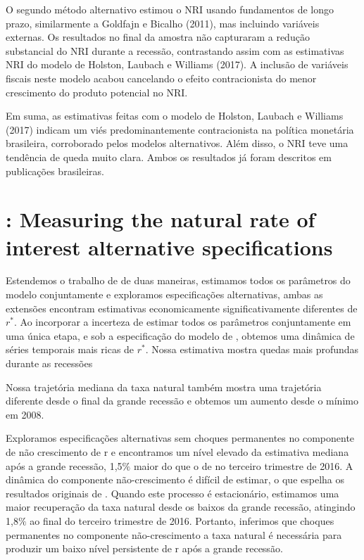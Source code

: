 \documentclass[11pt,oneside,a4paper]{article}
\begin{document}
O segundo método alternativo estimou o NRI usando fundamentos de longo prazo, similarmente a Goldfajn e Bicalho (2011), mas incluindo variáveis externas. Os resultados no final da amostra não capturaram a redução substancial do NRI durante a recessão, contrastando assim com as estimativas NRI do modelo de Holston, Laubach e Williams (2017). A inclusão de variáveis fiscais neste modelo acabou cancelando o efeito contracionista do menor crescimento do produto potencial no NRI.

Em suma, as estimativas feitas com o modelo de Holston, Laubach e Williams (2017) indicam um viés predominantemente contracionista na política monetária brasileira, corroborado pelos modelos alternativos. Além disso, o NRI teve uma tendência de queda muito clara. Ambos os resultados já foram descritos em publicações brasileiras.
%
%
\section{\citet{Lewis:2017}: Measuring the natural rate of interest alternative specifications }

Estendemos o trabalho de \citet{LW:2003} de duas maneiras, estimamos todos os parâmetros do modelo conjuntamente e exploramos especificações alternativas, ambas as extensões encontram estimativas economicamente significativamente diferentes de $r^*$. Ao incorporar a incerteza de estimar todos os parâmetros conjuntamente em uma única etapa, e sob a especificação do modelo de \citet{HLW:2017}, obtemos uma dinâmica de séries temporais mais ricas de $r^*$. Nossa estimativa mostra quedas mais profundas durante as recessões

Nossa trajetória mediana da taxa natural também mostra uma trajetória diferente desde o final da grande recessão e obtemos um aumento desde o mínimo em 2008.

Exploramos especificações alternativas sem choques permanentes no componente de não crescimento de r e encontramos um nível elevado da estimativa mediana após a grande recessão, 1,5$\%$ maior do que o de \citet{HLW:2017} no terceiro trimestre de 2016. A dinâmica do componente não-crescimento é difícil de estimar, o que espelha os resultados originais de \citet{LW:2003}. Quando este processo é estacionário, estimamos uma maior recuperação da taxa natural desde os baixos da grande recessão, atingindo 1,8$\%$ ao final do terceiro trimestre de 2016. Portanto, inferimos que choques permanentes no componente não-crescimento a taxa natural é necessária para produzir um baixo nível persistente de r após a grande recessão.
\end{document}
